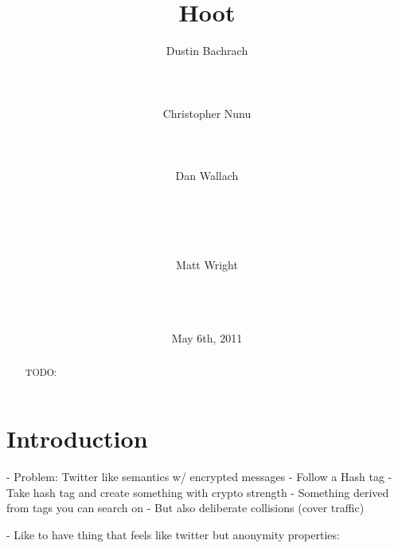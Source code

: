 \documentclass{acm_proc_article-sp}
\begin{document}

\author{
\alignauthor
	Dustin Bachrach\\
	\\
	\\
	\\
\alignauthor
 	Christopher Nunu\\
	\\
	\\
	\\
\alignauthor
	Dan Wallach\\
	\\
	\\
	\\
	\\
\and
\alignauthor
	Matt Wright\\
	\\
	\\
	\\
}

\title{Hoot}
\date{May 6th, 2011}

\maketitle

\begin{abstract}

TODO:

\end{abstract}

\section{Introduction}

- Problem: Twitter like semantics w/ encrypted messages
	- Follow a Hash tag
	- Take hash tag and create something with crypto strength
	- Something derived from tags you can search on
	- But also deliberate collisions (cover traffic)
	
- Like to have thing that feels like twitter but anonymity properties:
\end{document}
